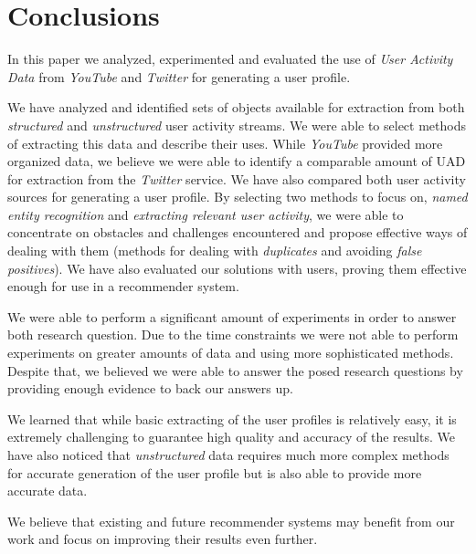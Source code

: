 \section{Conclusions}
\label{sec:conclusion}

In this paper we analyzed, experimented and evaluated the use of \textit{User Activity Data} from \textit{YouTube}
and \textit{Twitter} for generating a user profile.

We have analyzed and identified sets of objects available for extraction from both \textit{structured} and
\textit{unstructured} user activity streams. We were able to select methods of extracting this data and describe
their uses. While \textit{YouTube} provided more organized data, we believe we were able to identify a comparable
amount of UAD for extraction from the \textit{Twitter} service.
We have also compared both user activity sources for generating a user profile. By selecting two methods to focus
on, \ie \textit{named entity recognition} and \textit{extracting relevant user activity}, we were able to concentrate
on obstacles and challenges encountered and propose effective ways of dealing with them (\ie methods for dealing with
\textit{duplicates} and avoiding \textit{false positives}). We have also evaluated our solutions with users, proving
them effective enough for use in a recommender system.

We were able to perform a significant amount of experiments in order to answer both research question. Due to the time
constraints we were not able to perform experiments on greater amounts of data and using more sophisticated methods.
Despite that, we believed we were able to answer the posed research questions by providing enough evidence to back our
answers up.

We learned that while basic extracting of the user profiles is relatively easy, it is extremely challenging to
guarantee high quality and accuracy of the results. We have also noticed that \textit{unstructured} data requires
much more complex methods for accurate generation of the user profile but is also able to provide more
accurate data.

We believe that existing and future recommender systems may benefit from our work and focus on improving their results
even further.